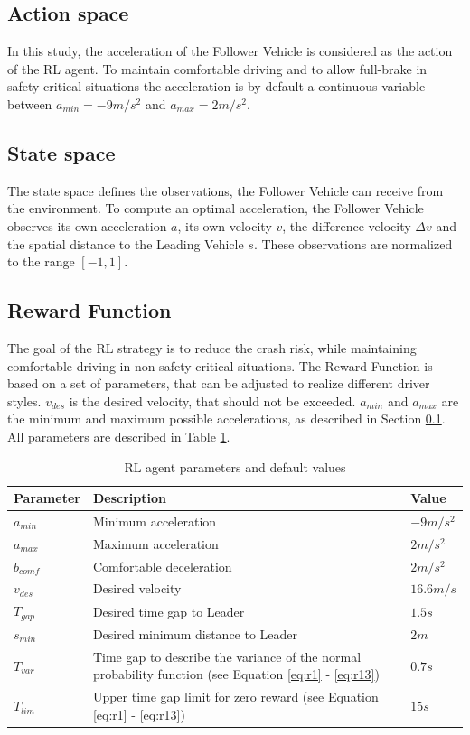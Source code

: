 \documentclass[review]{elsarticle}
\begin{document}
\subsection{Action space}
\label{actionSpace}
In this study, the acceleration of the Follower Vehicle is considered as the action of the RL agent. To maintain  comfortable driving and to allow full-brake in safety-critical situations the acceleration is by default a continuous variable between $a_{min} = -9m/s^2$ and $a_{max} = 2m/s^2$.


\subsection{State space}
The state space defines the observations, the Follower Vehicle can receive from the environment. To compute an optimal acceleration, the Follower Vehicle observes its own acceleration $a$, its own velocity $v$, the difference velocity $\Delta v$ and the spatial distance to the Leading Vehicle $s$. These observations are normalized to the range $[-1,1]$.


\subsection{Reward Function}
\label{rewardFunction}
The goal of the RL strategy is to reduce the crash risk, while maintaining comfortable driving in non-safety-critical situations. The Reward Function is based on a set of parameters, that can be adjusted to realize different driver styles. $v_{des}$ is the desired velocity, that should not be exceeded. $a_{min}$ and $a_{max}$ are the minimum and maximum possible accelerations, as described in Section \ref{actionSpace}. All parameters are described in Table \ref{tab:agentParameters}.

\begin{table}
\caption{RL agent parameters and default values} 
\label{tab:agentParameters} 
\begin{center}
\begin{tabular}{ p{}| p{}| p{}}
	Parameter & Description & Value \\ \hline
	$a_{min}$ & Minimum acceleration & $-9m/s^2$ \\  
	$a_{max}$ & Maximum acceleration & $2m/s^2$ \\  
	$b_{comf}$ & Comfortable deceleration & $2m/s^2$ \\  
	$v_{des}$ & Desired velocity & $16.6 m/s$ \\  		
	$T_{gap}$ & Desired time gap to Leader & $1.5s$ \\
	$s_{min}$ & Desired minimum distance to Leader & $2m$ \\
	$T_{var}$ & Time gap to describe the variance of the normal probability function (see Equation \ref{eq:r1} - \ref{eq:r13}) & $0.7s$ \\
	$T_{lim}$ & Upper time gap limit for zero reward (see Equation \ref{eq:r1} - \ref{eq:r13}) & $15s$ 
\end{tabular}
\end{center}
\end{table}
\end{document}
